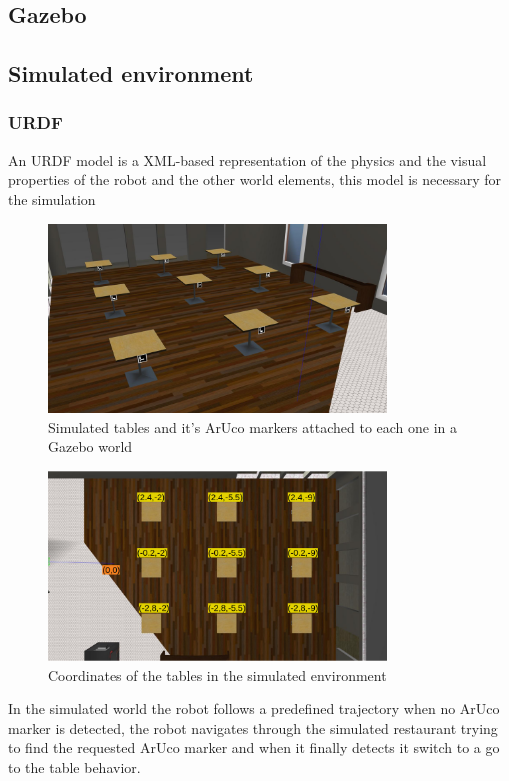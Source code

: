 \subsection{Gazebo}
\subsection{Simulated environment}
\subsubsection{URDF}
An URDF model is a XML-based representation of the physics and the visual properties of the robot and the other world elements, this model is necessary for the simulation 
\begin{figure}[h!]
    \centering
 	\includegraphics[trim=0 0 0 0,clip,width=0.8\textwidth]{Figs/Gzworld.jpg}
    \caption{Simulated tables and it's ArUco markers attached to each one in a Gazebo world}
    \label{fig:Gzworld}
\end{figure}
\begin{figure}[h!]
    \centering
 	\includegraphics[trim=0 0 0 0,clip,width=0.8\textwidth]{Figs/Cords_tables.png}
    \caption{Coordinates of the tables in the simulated environment}
    \label{fig:Cords_Tables}
\end{figure}

In the simulated world the robot follows a predefined trajectory when no ArUco marker is detected, the robot navigates through the simulated restaurant trying to find the requested ArUco marker and when it finally detects it switch to a go to the table behavior.

